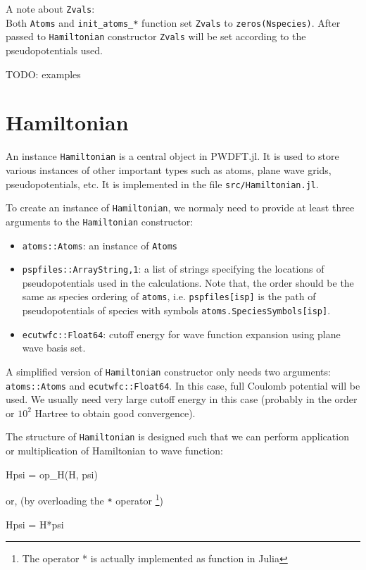 \documentclass[a4paper,12pt]{article}
\newcommand{\jlcode}[1]{\texttt{#1}}
\begin{document}
A note about \jlcode{Zvals}: \\
Both \jlcode{Atoms} and \jlcode{init_atoms_*} function set
\jlcode{Zvals} to \jlcode{zeros(Nspecies)}.
After passed to \jlcode{Hamiltonian} constructor
\jlcode{Zvals} will be set according to the pseudopotentials used.

TODO: examples

\section{Hamiltonian}

An instance \jlcode{Hamiltonian} is a central object in \textsf{PWDFT.jl}.
It is used to store various instances of other important types
such as atoms, plane wave grids, pseudopotentials, etc.
It is implemented in the file \texttt{src/Hamiltonian.jl}.

To create an instance of \jlcode{Hamiltonian}, we normaly need to provide at least
three arguments to the \jlcode{Hamiltonian} constructor:
%
\begin{itemize}
%
\item \jlcode{atoms::Atoms}: an instance of \jlcode{Atoms}
%
\item \jlcode{pspfiles::Array{String,1}}: a list of strings specifying the
  locations of pseudopotentials used in the
  calculations. Note that, the order should be the same as species ordering
  of \jlcode{atoms}, i.e. \jlcode{pspfiles[isp]} is the path of
  pseudopotentials of species with symbols \jlcode{atoms.SpeciesSymbols[isp]}.
%
\item \jlcode{ecutwfc::Float64}: cutoff energy for wave function
  expansion using plane wave basis set.
\end{itemize}

A simplified version of \jlcode{Hamiltonian} constructor only needs two arguments:
\jlcode{atoms::Atoms} and \jlcode{ecutwfc::Float64}. In this case, full Coulomb potential
will be used. We usually need very large cutoff energy in this case (probably
in the order or $10^2$ Hartree to obtain good convergence).

The structure of \jlcode{Hamiltonian} is designed such that we can perform
application or multiplication of Hamiltonian to wave function:
%
\begin{juliacode}
Hpsi = op_H(H, psi)
\end{juliacode}
%
or, (by overloading the \jlcode{*} operator
\footnote{The operator * is actually implemented as function in Julia})
%
\begin{juliacode}
Hpsi = H*psi
\end{juliacode}
\end{document}
